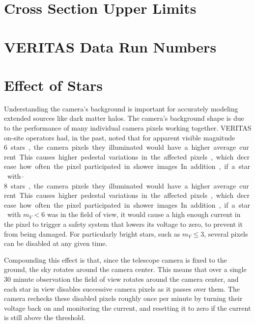 \cleartooddpage[\thispagestyle{empty}]

\renewcommand{\thechapter}{\thechapter}
\renewcommand{\thesection}{\thechapter.\arabic{section}}
\renewcommand{\thesubsection}{\thechapter.\arabic{section}.\arabic{subsection}}
\renewcommand{\thesubsubsection}{\thechapter.\arabic{section}.\arabic{subsection}.\arabic{subsubsection}}
\renewcommand{\thefigure}{\thechapter.\arabic{figure}}
\renewcommand{\thetable}{\thechapter.\arabic{table}}
\renewcommand{\theequation}{\thechapter.\arabic{equation}}
\appendix

\chapter{Cross Section Upper Limits}



\chapter{VERITAS Data Run Numbers}\label{app:runlists}



\chapter{Effect of Stars}\label{app:starpixels}

  Understanding the camera's background is important for accurately modeling extended sources like dark matter halos.
  The camera's background shape is due to the performance of many individual camera pixels working together.
  VERITAS on-site operators had, in the past, noted that for apparent visible magnitude \SIrange{6}{8} stars, the camera pixels they illuminated would have a higher average current.
  This causes higher pedestal variations in the affected pixels, which decrease how often the pixel participated in shower images.
  In addition, if a star with $m_V < 6$ was in the field of view, it would cause a high enough current in the pixel to trigger a safety system that lowers its voltage to zero, to prevent it from being damaged.
  For particularly bright stars, such as $m_V \leq 3$, several pixels can be disabled at any given time.

  Compounding this effect is that, since the telescope camera is fixed to the ground, the sky rotates around the camera center.
  This means that over a single 30 minute observation the field of view rotates around the camera center, and each star in view disables successive camera pixels as it passes over them.
  The camera rechecks these disabled pixels roughly once per minute by turning their voltage back on and monitoring the current, and resetting it to zero if the current is still above the threshold.

